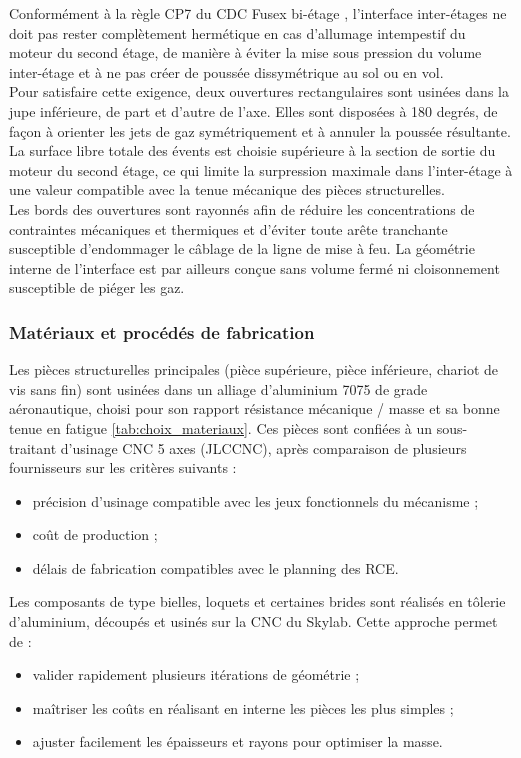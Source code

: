Conformément à la règle CP7 du \acrshort{CDC} \gls{Fusex} bi-étage \cite[p.~59]{CDC_BiEtage}, l'interface inter-étages ne doit
pas rester complètement hermétique en cas d'allumage intempestif du moteur du second étage, de manière à éviter la mise sous
pression du volume inter-étage et à ne pas créer de poussée dissymétrique au sol ou en vol.\\

Pour satisfaire cette exigence, deux ouvertures rectangulaires sont usinées dans la jupe inférieure, de part et d'autre de
l'axe. Elles sont disposées à 180 degrés, de façon à orienter les jets de gaz symétriquement et à annuler la poussée résultante.
La surface libre totale des évents est choisie supérieure à la section de sortie du moteur du second étage, ce qui limite la
surpression maximale dans l'inter-étage à une valeur compatible avec la tenue mécanique des pièces structurelles.\\

Les bords des ouvertures sont rayonnés afin de réduire les concentrations de contraintes mécaniques et thermiques et d'éviter
toute arête tranchante susceptible d'endommager le câblage de la ligne de mise à feu. La géométrie interne de l'interface est
par ailleurs conçue sans volume fermé ni cloisonnement susceptible de piéger les gaz.

\subsubsection{Matériaux et procédés de fabrication}

Les pièces structurelles principales (pièce supérieure, pièce inférieure, chariot de vis sans fin) sont usinées dans un alliage
d'aluminium 7075 de grade aéronautique, choisi pour son rapport résistance mécanique / masse et sa bonne tenue en fatigue
\ref{tab:choix_materiaux}. Ces pièces sont confiées à un sous-traitant d'usinage \acrshort{CNC} 5 axes (JLCCNC), après
comparaison de plusieurs fournisseurs sur les critères suivants :
\begin{itemize}
    \item précision d'usinage compatible avec les jeux fonctionnels du mécanisme ;
    \item coût de production ;
    \item délais de fabrication compatibles avec le planning des \acrshort{RCE}.\\
\end{itemize}

Les composants de type bielles, loquets et certaines brides sont réalisés en tôlerie d'aluminium, découpés et usinés sur la
\acrshort{CNC} du \gls{Skylab}. Cette approche permet de :
\begin{itemize}
    \item valider rapidement plusieurs itérations de géométrie ;
    \item maîtriser les coûts en réalisant en interne les pièces les plus simples ;
    \item ajuster facilement les épaisseurs et rayons pour optimiser la masse.\\
\end{itemize}

